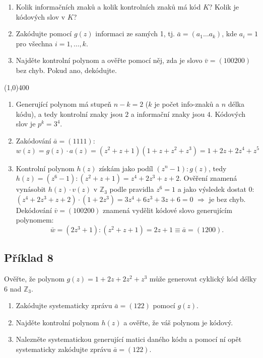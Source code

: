 \documentclass{article}
\begin{document}
\begin{enumerate}
	\item Kolik informačních znaků a kolik kontrolních znaků má kód $K$? Kolik je kódových slov v $K$? 
	\item Zakódujte pomocí $g(z)$ informaci ze samých 1, tj. $\bar{a} = (a_1\ldots a_k)$, kde $a_i = 1$ pro všechna $i = 1,\ldots,k$.
	\item Najděte kontrolní polynom a ověřte pomocí něj, zda je slovo $\bar{v} = (100200)$ bez chyb. Pokud ano, dekódujte.
\end{enumerate}

\line(1,0){400}

\begin{enumerate}
	\item Generující polynom má stupeň $n-k=2$ ($k$ je počet info-znaků a $n$ délka kódu), a tedy kontrolní znaky jsou $2$ a informační znaky jsou $4$. Kódových slov je $p^k = 3^4$. 
	\item Zakódování $\bar{a} = (1111)$:
	\[ w(z) = g(z)\cdot a(z) = (z^2 + z + 1)(1+z+z^2+z^3) = 1 + 2z + 2z^4 + z^5 \]
	\item Kontrolní polynom $h(z)$ získám jako podíl $(z^n-1):g(z)$, tedy $h(z) = (z^6-1):(z^2 + z + 1) = z^4 + 2z^3 + z + 2$. Ověření znamená vynásobit $h(z)\cdot v(z)$ v $\mathbb{Z}_3$ podle pravidla $z^6=1$ a jako výsledek dostat 0: $(z^4 + 2z^3 + z + 2)\cdot(1 + 2z^3) = 3z^4 + 6z^3 + 3z + 6 = 0$ $\Rightarrow$ je bez chyb. Dekódování $\bar{v} = (100200)$ znamená vydělit kódové slovo generujícím polynomem:
	\[ \bar{w} = (2z^3 + 1):(z^2 + z + 1) = 2z + 1 \equiv \bar{a} = (1200).\] 
\end{enumerate}


\subsection{Příklad 8}
Ověřte, že polynom $g(z) = 1 + 2z + 2z^2 + z^3$ může generovat cyklický kód délky 6 nad $\mathbb{Z}_3$.

\begin{enumerate}
	\item Zakódujte systematicky zprávu $\bar{a} = (122)$ pomocí $g(z)$.
	\item Najděte kontrolní polynom $h(z)$ a ověřte, že váš polynom je kódový.
	\item Nalezněte systematickou generující matici daného kódu a pomocí ní opět systematicky zakódujte zprávu $\bar{a} = (122)$.
\end{enumerate}
\end{document}
